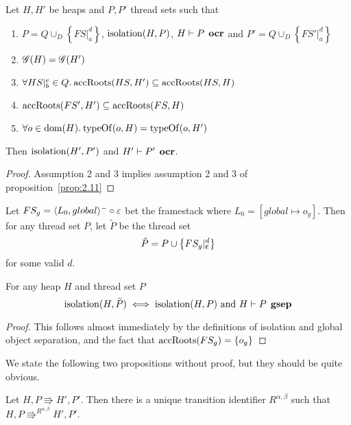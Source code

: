 \begin{corollary} 
  Let $H, H'$ be heaps and $P, P'$ thread sets such that
  \begin{enumerate}
    \item $P = Q \cup_D \left\{ FS|_a^d \right\}$, $\mbox{$\mathrm{isolation}$}{(H, P)}$, $H
      \vdash P \:\: \mbox{\bf ocr}$ and $P' = Q \cup_D \left\{ FS'|_a^d \right\}$
    \item $\mathscr{G}{(H)} = \mathscr{G}{(H')}$
    \item $\forall HS|_b^e \in Q. \: \mbox{$\mathrm{accRoots}$}{(HS, H')} \subseteq \mbox{$\mathrm{accRoots}$}{(HS, H)}$
    \item $\mbox{$\mathrm{accRoots}$}{(FS', H')} \subseteq \mbox{$\mathrm{accRoots}$}{(FS, H)}$
    \item $\forall o \in \mbox{$\mathrm{dom}$}{(H)}. \: \mbox{$\mathrm{typeOf}$}{(o, H)} = \mbox{$\mathrm{typeOf}$}{(o, H')}$
  \end{enumerate}
  Then $\mbox{$\mathrm{isolation}$}{(H', P')}$ and $H' \vdash P' \:\: \mbox{\bf ocr}$.
\end{corollary}

\begin{proof}
  Assumption 2 and 3 implies assumption 2 and 3 of
  proposition~\ref{prop:2.11}
\end{proof}

\begin{definition} \label{def:ptilde}
  Let $FS_g = \mbox{$\langle L_0, global \rangle^{-}$} \circ \varepsilon$ bet the framestack where
  $L_0 = [global \mapsto o_g]$. Then for any thread set $P$, let $\tilde{P}$ be the
  thread set
  \begin{equation*}
    \tilde{P} = P \cup \left\{ FS_g|_{\mbox{$\epsilon$}}^d \right\}
  \end{equation*}
  for some valid $d$.
\end{definition}

\begin{proposition} \label{prop:2.8}
  For any heap $H$ and thread set $P$
  \begin{equation*}
    \mbox{$\mathrm{isolation}$}{(H, \tilde{P})} \iff \mbox{$\mathrm{isolation}$}{(H, P)} \text{ and } H \vdash P
    \:\: \mbox{\bf gsep} 
  \end{equation*}
\end{proposition}

\begin{proof}
  This follows almost immediately by the definitions of isolation and global
  object separation, and the fact that $\mbox{$\mathrm{accRoots}$}(FS_g) = \left\{
    o_g \right\}$ 
\end{proof}

We state the following two propositions without proof, but they should be quite
obvious.
\begin{proposition} \label{prop:uniq_trans}
  Let $H, P \Rrightarrow H', P'$. Then there is a unique transition identifier
  $R^{\alpha, \beta}$ such that $H, P \Rrightarrow^{R^{\alpha, \beta}} H', P'$.
\end{proposition}

